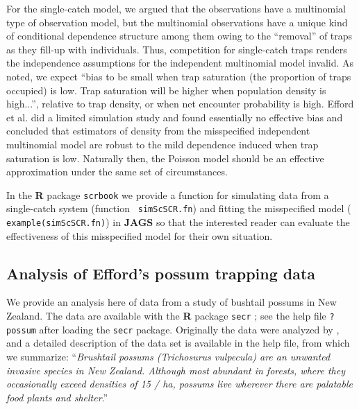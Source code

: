 For the single-catch model, we argued that the observations  
have a multinomial type of observation model, but the
multinomial observations have a unique kind of conditional dependence
structure among them owing to the ``removal'' of traps as they fill-up
with individuals. 
Thus, 
competition for single-catch traps renders the independence
assumptions for the independent multinomial model invalid.  As
\citet{efford_etal:2009euring} noted, we expect ``bias to be small
when trap saturation (the proportion of traps occupied) is low.  Trap
saturation will be higher when population density is high...'',
relative to trap density, or when net encounter probability is high.
Efford et al. did a limited simulation study and found essentially no
effective bias and concluded that estimators of density from the
misspecified independent multinomial model are robust to the mild
dependence induced when trap saturation is low.  Naturally then, the
Poisson model should be an effective approximation under the same set
of circumstances.

In the {\bf R} package \mbox{\tt scrbook} we provide a function for
simulating data from a single-catch system (function \mbox{\tt
  simScSCR.fn}) and fitting the misspecified model (\mbox{\tt
  example(simScSCR.fn)}) in {\bf JAGS} so that the interested reader can
evaluate the effectiveness of this misspecified model for their own
situation.


\subsection{Analysis of Efford's possum trapping data}

We provide an analysis here of data from a study of bushtail possums
in New Zealand. The data are available with the {\bf R} package \mbox{\tt secr}
\citep{efford_etal:2009euring};
see the help file \mbox{\tt ?possum} after loading the \mbox{\tt secr} package.
Originally the data were analyzed by \citet{efford_etal:2005}, and
a detailed description of the data set is available in the help file,
from which we summarize:
``{\it Brushtail possums (Trichosurus vulpecula) are an unwanted invasive
species in New Zealand. Although most abundant in forests, where they
occasionally exceed densities of 15 / ha, possums live wherever there
are palatable food plants and shelter}.''

